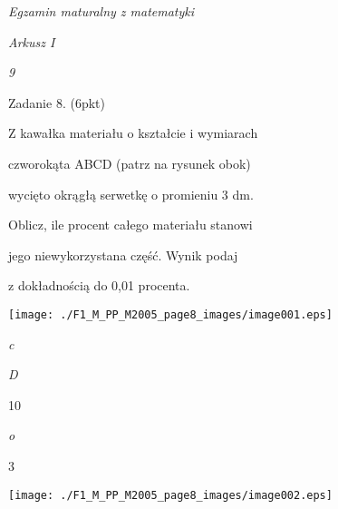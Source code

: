 \documentclass[a4paper,12pt]{article}
\begin{document}
{\it Egzamin maturalny z matematyki}

{\it Arkusz I}

{\it 9}

Zadanie 8. (6pkt)

Z kawałka materiału o kształcie i wymiarach

czworokąta ABCD (patrz na rysunek obok)

wycięto okrągłą serwetkę o promieniu 3 dm.

Oblicz, ile procent całego materiału stanowi

jego niewykorzystana część. Wynik podaj

z dokładnością do 0,01 procenta.
\begin{center}
\texttt{[image: ./F1\_M\_PP\_M2005\_page8\_images/image001.eps]}
\end{center}
{\it c}

{\it D}

10

{\it o}

3
\begin{center}
\texttt{[image: ./F1\_M\_PP\_M2005\_page8\_images/image002.eps]}
\end{center}
\end{document}
